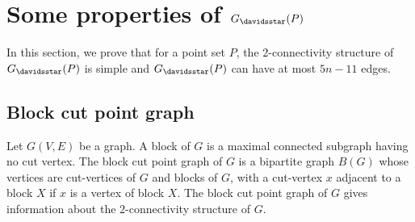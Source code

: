 \section{Some properties of $G_{\davidsstar}(P)$}
In this section, we prove that for a point set $P$, the 2-connectivity structure of $G_{\davidsstar}(P)$ is simple and $G_{\davidsstar}(P)$ can have at 
most $5n-11$ edges.
\subsection{Block cut point graph}
Let $G(V, E)$ be a graph. A block of $G$ is a maximal connected subgraph having no cut vertex. The block cut point graph of $G$ is a
bipartite graph $B(G)$ whose vertices are cut-vertices of $G$ and blocks of $G$, with a cut-vertex
$x$ adjacent to a block $X$ if $x$ is a vertex of block $X$. The block cut point graph of $G$ gives information about the $2$-connectivity structure 
of $G$. 


